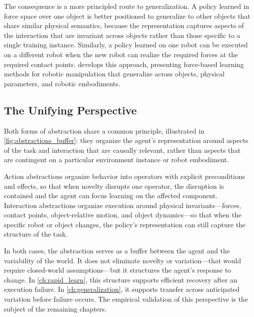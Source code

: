 The consequence is a more principled route to generalization. A policy learned in force space over one object is better positioned to generalize to other objects that share similar physical semantics, because the representation captures aspects of the interaction that are invariant across objects rather than those specific to a single training instance. Similarly, a policy learned on one robot can be executed on a different robot when the new robot can realize the required forces at the required contact points.  develops this approach, presenting force-based learning methods for robotic manipulation that generalize across objects, physical parameters, and robotic embodiments.



\subsection{The Unifying Perspective}
\label{sec:unifying_perspective}

Both forms of abstraction share a common principle, illustrated in \cref{fig:abstractions_buffer}: they organize the agent's representation around aspects of the task and interaction that are causally relevant, rather than aspects that are contingent on a particular environment instance or robot embodiment.

Action abstractions organize behavior into operators with explicit preconditions and effects, so that when novelty disrupts one operator, the disruption is contained and the agent can focus learning on the affected component. Interaction abstractions organize execution around physical invariants---forces, contact points, object-relative motion, and object dynamics---so that when the specific robot or object changes, the policy's representation can still capture the structure of the task.

In both cases, the abstraction serves as a buffer between the agent and the variability of the world. It does not eliminate novelty or variation---that would require closed-world assumptions---but it structures the agent's response to change. In \cref{ch:rapid_learn}, this structure supports efficient recovery after an execution failure. In \cref{ch:generalization}, it supports transfer across anticipated variation before failure occurs. The empirical validation of this perspective is the subject of the remaining chapters.
